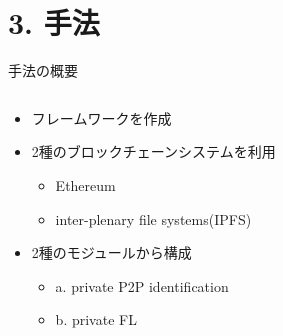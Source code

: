 \documentclass[unicode,12pt,aspectratio=169, dvipdfmx]{beamer}
\begin{document}
    \section{3. 手法}
    \begin{frame}{手法の概要}
        \begin{columns}
            \begin{column}[]{.8\linewidth}
                \begin{itemize}
                    \item フレームワークを作成
                    \item 2種のブロックチェーンシステムを利用
                    \begin{itemize}
                        \item Ethereum
                        \item inter-plenary file systems(IPFS)
                    \end{itemize}
                    \item 2種のモジュールから構成
                    \begin{itemize}
                        \item a. private P2P identification
                        \item b. private FL
                    \end{itemize}
                \end{itemize}
            \end{column}
        \end{columns}
    \end{frame}
\end{document}
